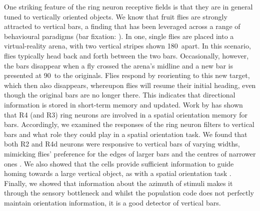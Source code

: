 One striking feature of the ring neuron receptive fields is that they are in general tuned to vertically oriented objects. We know that fruit flies are strongly attracted to vertical bars, a finding that has been leveraged across a range of behavioural paradigms (bar fixation: \cite{Neuser2008}). In one, single flies are placed into a virtual-reality arena, with two vertical stripes shown 180\degree\ apart. In this scenario, flies typically head back and forth between the two bars. Occasionally, however, the bars disappear when a fly crossed the arena’s midline and a new bar is presented at 90\degree\ to the originals. Flies respond by reorienting to this new target, which then also disappears, whereupon flies will resume their initial heading, even though the original bars are no longer there. This indicates that directional information is stored in short-term memory and updated. Work by \cite{Neuser2008} has shown that R4 (and R3) ring neurons are involved in a spatial orientation memory for bars. Accordingly, we examined the responses of the ring neuron filters to vertical bars and what role they could play in a spatial orientation task. We found that both R2 and R4d neurons were responsive to vertical bars of varying widths, mimicking flies' preference for the edges of larger bars and the centres of narrower ones \cite{Osorio1990}. We also showed that the cells provide sufficient information to guide homing towards a large vertical object, as with a spatial orientation task \cite{Neuser2008}. Finally, we showed that information about the azimuth of stimuli makes it through the sensory bottleneck and whilst the population code does not perfectly maintain orientation information, it is a good detector of vertical bars.

